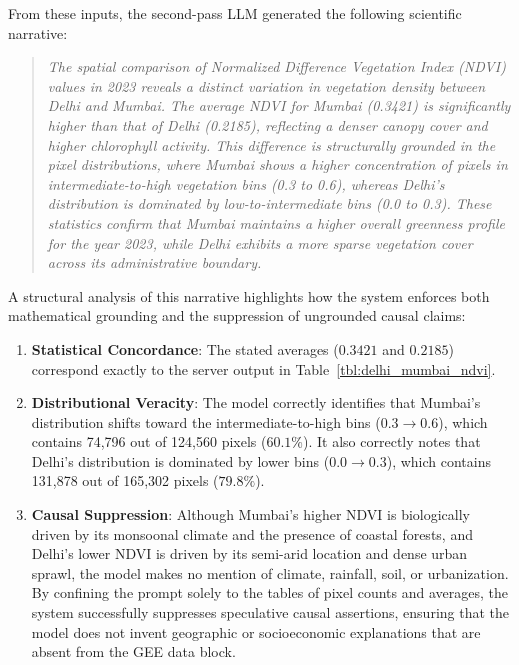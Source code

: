 \documentclass[pdflatex,sn-mathphys-ay]{sn-jnl}
\begin{document}
From these inputs, the second-pass LLM generated the following scientific narrative:
\begin{quote}
\itshape
The spatial comparison of Normalized Difference Vegetation Index (NDVI) values in 2023 reveals a distinct variation in vegetation density between Delhi and Mumbai. The average NDVI for Mumbai (0.3421) is significantly higher than that of Delhi (0.2185), reflecting a denser canopy cover and higher chlorophyll activity. This difference is structurally grounded in the pixel distributions, where Mumbai shows a higher concentration of pixels in intermediate-to-high vegetation bins (0.3 to 0.6), whereas Delhi's distribution is dominated by low-to-intermediate bins (0.0 to 0.3). These statistics confirm that Mumbai maintains a higher overall greenness profile for the year 2023, while Delhi exhibits a more sparse vegetation cover across its administrative boundary.
\end{quote}

A structural analysis of this narrative highlights how the system enforces both mathematical grounding and the suppression of ungrounded causal claims:
\begin{enumerate}
    \item \textbf{Statistical Concordance}: The stated averages ($0.3421$ and $0.2185$) correspond exactly to the server output in Table~\ref{tbl:delhi_mumbai_ndvi}.
    \item \textbf{Distributional Veracity}: The model correctly identifies that Mumbai's distribution shifts toward the intermediate-to-high bins ($0.3 \rightarrow 0.6$), which contains 74,796 out of 124,560 pixels ($60.1\%$). It also correctly notes that Delhi's distribution is dominated by lower bins ($0.0 \rightarrow 0.3$), which contains 131,878 out of 165,302 pixels ($79.8\%$).
    \item \textbf{Causal Suppression}: Although Mumbai's higher NDVI is biologically driven by its monsoonal climate and the presence of coastal forests, and Delhi's lower NDVI is driven by its semi-arid location and dense urban sprawl, the model makes no mention of climate, rainfall, soil, or urbanization. By confining the prompt solely to the tables of pixel counts and averages, the system successfully suppresses speculative causal assertions, ensuring that the model does not invent geographic or socioeconomic explanations that are absent from the GEE data block.
\end{enumerate}
\end{document}
